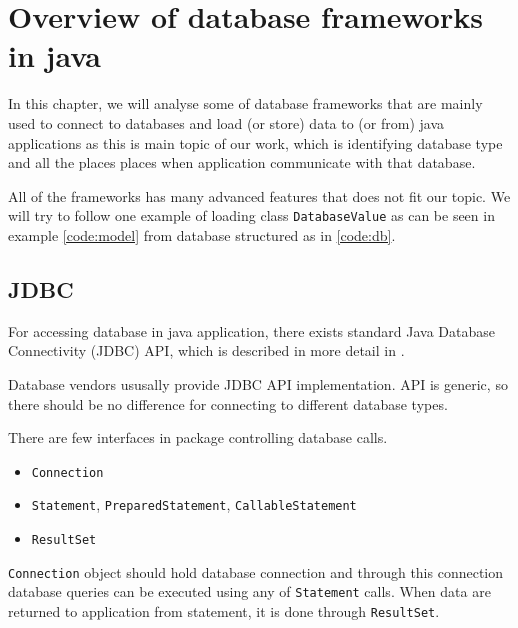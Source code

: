 \newcommand{\InsertCode}[2]{\begin{figure}[#1]\end{figure}}

\newcommand{\Code}[1]{\texttt{#1}}

\chapter{Overview of database frameworks in java \label{frameworks}}

In this chapter, we will analyse some of database frameworks that are mainly used
to connect to databases and load (or store) data to (or from) java applications
as this is main topic of our work, which is identifying database type
and all the places places when application communicate with that database.

All of the frameworks has many advanced features that does not fit our topic.
We will try to follow one example of loading class \Code{DatabaseValue} as can be seen in
example \ref{code:model} from database structured as in \ref{code:db}.

\InsertCode{h}{code/model}






\section{JDBC \label{frameworks:jdbc}}

For accessing database in java application, there exists standard Java Database Connectivity (JDBC) API,
which is described in more detail in \citet{JDBC_OVERVIEW}.

Database vendors ususally provide JDBC API implementation. API is generic, so
there should be no difference for connecting to different database types.

There are few interfaces in \citet{java.sql} package controlling database calls.
\begin{itemize}
  \item \Code{Connection}
  \item \Code{Statement}, \Code{PreparedStatement}, \Code{CallableStatement}
  \item \Code{ResultSet}
\end{itemize}

\Code{Connection} object should hold database connection and through this connection
database queries can be executed using any of \Code{Statement} calls.
When data are returned to application from statement, it is done through \Code{ResultSet}.

